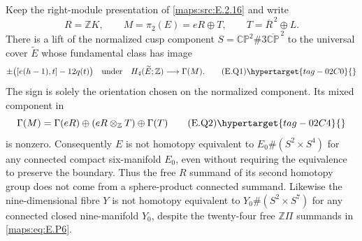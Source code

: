 \begin{proposition}\hypertarget{tag-02MI}{}\label{maps:src:E.2.18}


Keep the right-module presentation of \ref{maps:src:E.2.16} and write
\[
 R=\mathbb ZK,\qquad M=\pi_2(E)=eR\oplus T,
 \qquad T=\overline R^{\,2}\oplus L.
\]
There is a lift of the normalized cusp component
$S=\mathbb {CP}^2\#3\overline{\mathbb {CP}}^{\,2}$ to the
universal cover $\widetilde E$ whose fundamental class has image
\[
 \pm\bigl([e(h-1),t]-12q(t)\bigr)
       \quad\hbox{under}\quad
 H_4(\widetilde E;\mathbb Z)\longrightarrow\Gamma(M).
 \tag{E.Q1}\hypertarget{tag-02C0}{}\label{maps:eq:E.Q1}
\]
The sign is solely the orientation chosen on the normalized
component.  Its mixed component in
\[
 \Gamma(M)=\Gamma(eR)\oplus(eR\otimes_{\mathbb Z}T)
                                      \oplus\Gamma(T)
 \tag{E.Q2}\hypertarget{tag-02C4}{}\label{maps:eq:E.Q2}
\]
is nonzero.  Consequently $E$ is not homotopy equivalent to
$E_0\#(S^2\times S^4)$ for any connected compact six-manifold
$E_0$, even without requiring the equivalence to preserve the
boundary.  Thus the free $R$ summand of its second homotopy group
does not come from a sphere-product connected summand.
Likewise the nine-dimensional fibre $Y$ is not
homotopy equivalent to $Y_0\#(S^2\times S^7)$ for any
connected closed nine-manifold $Y_0$, despite the twenty-four
free $\mathbb Z\Pi$ summands in \eqref{maps:eq:E.P6}.

\end{proposition}



